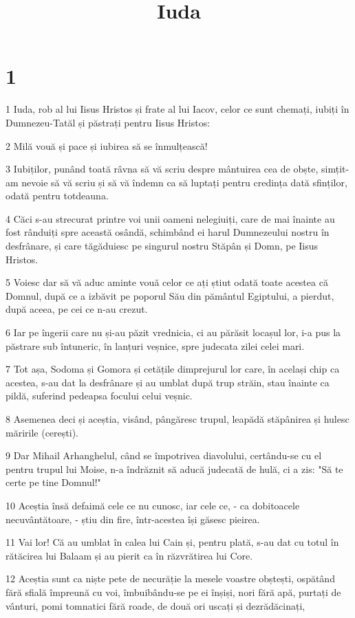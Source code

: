 

\title{Iuda}


\chapter{1}

\par 1 Iuda, rob al lui Iisus Hristos și frate al lui Iacov, celor ce sunt chemați, iubiți în Dumnezeu-Tatăl și păstrați pentru Iisus Hristos:
\par 2 Milă vouă și pace și iubirea să se înmulțească!
\par 3 Iubiților, punând toată râvna să vă scriu despre mântuirea cea de obște, simțit-am nevoie să vă scriu și să vă îndemn ca să luptați pentru credința dată sfinților, odată pentru totdeauna.
\par 4 Căci s-au strecurat printre voi unii oameni nelegiuiți, care de mai înainte au fost rânduiți spre această osândă, schimbând ei harul Dumnezeului nostru în desfrânare, și care tăgăduiesc pe singurul nostru Stăpân și Domn, pe Iisus Hristos.
\par 5 Voiesc dar să vă aduc aminte vouă celor ce ați știut odată toate acestea că Domnul, după ce a izbăvit pe poporul Său din pământul Egiptului, a pierdut, după aceea, pe cei ce n-au crezut.
\par 6 Iar pe îngerii care nu și-au păzit vrednicia, ci au părăsit locașul lor, i-a pus la păstrare sub întuneric, în lanțuri veșnice, spre judecata zilei celei mari.
\par 7 Tot așa, Sodoma și Gomora și cetățile dimprejurul lor care, în același chip ca acestea, s-au dat la desfrânare și au umblat după trup străin, stau înainte ca pildă, suferind pedeapsa focului celui veșnic.
\par 8 Asemenea deci și aceștia, visând, pângăresc trupul, leapădă stăpânirea și hulesc măririle (cerești).
\par 9 Dar Mihail Arhanghelul, când se împotrivea diavolului, certându-se cu el pentru trupul lui Moise, n-a îndrăznit să aducă judecată de hulă, ci a zis: "Să te certe pe tine Domnul!"
\par 10 Aceștia însă defaimă cele ce nu cunosc, iar cele ce, - ca dobitoacele necuvântătoare, - știu din fire, într-acestea își găsesc pieirea.
\par 11 Vai lor! Că au umblat în calea lui Cain și, pentru plată, s-au dat cu totul în rătăcirea lui Balaam și au pierit ca în răzvrătirea lui Core.
\par 12 Aceștia sunt ca niște pete de necurăție la mesele voastre obștești, ospătând fără sfială împreună cu voi, îmbuibându-se pe ei înșiși, nori fără apă, purtați de vânturi, pomi tomnatici fără roade, de două ori uscați și dezrădăcinați,
